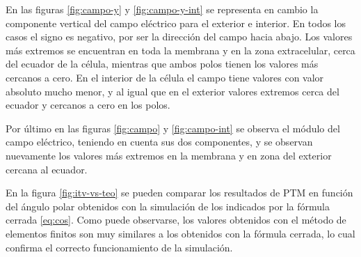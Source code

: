 En las figuras \ref{fig:campo-y} y \ref{fig:campo-y-int} se representa en cambio la componente vertical del campo eléctrico para el exterior e interior. En todos los casos el signo es negativo, por ser la dirección del campo hacia abajo. Los valores más extremos se encuentran en toda la membrana y en la zona extracelular, cerca del ecuador de la célula, mientras que ambos polos tienen los valores más cercanos a cero. En el interior de la célula el campo tiene valores con valor absoluto mucho menor, y al igual que en el exterior valores extremos cerca del ecuador y cercanos a cero en los polos.


Por último en las figuras \ref{fig:campo} y \ref{fig:campo-int} se observa el módulo del campo eléctrico, teniendo en cuenta sus dos componentes, y se observan nuevamente los valores más extremos en la membrana y en zona del exterior cercana al ecuador.

En la figura \ref{fig:itv-vs-teo} se pueden comparar los resultados de PTM en función del ángulo polar obtenidos con la simulación de los indicados por la fórmula cerrada \ref{eq:cos}. Como puede observarse, los valores obtenidos con el método de elementos finitos son muy similares a los obtenidos con la fórmula cerrada, lo cual confirma el correcto funcionamiento de la simulación. 

\clearpage






